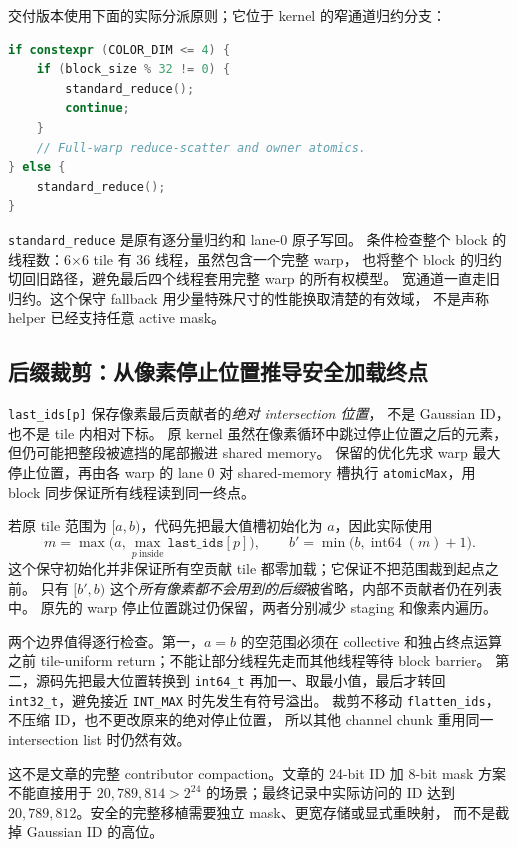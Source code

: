 交付版本使用下面的实际分派原则；它位于 kernel 的窄通道归约分支：
\begin{lstlisting}[language=C++]
if constexpr (COLOR_DIM <= 4) {
    if (block_size % 32 != 0) {
        standard_reduce();
        continue;
    }
    // Full-warp reduce-scatter and owner atomics.
} else {
    standard_reduce();
}
\end{lstlisting}
\texttt{standard\_reduce} 是原有逐分量归约和 lane-0 原子写回。
条件检查整个 block 的线程数：6\(\times\)6 tile 有 36 线程，虽然包含一个完整 warp，
也将整个 block 的归约切回旧路径，避免最后四个线程套用完整 warp 的所有权模型。
宽通道一直走旧归约。这个保守 fallback 用少量特殊尺寸的性能换取清楚的有效域，
不是声称 helper 已经支持任意 active mask。

\subsection{后缀裁剪：从像素停止位置推导安全加载终点}

\texttt{last\_ids[p]} 保存像素最后贡献者的\emph{绝对 intersection 位置}，
不是 Gaussian ID，也不是 tile 内相对下标。
原 kernel 虽然在像素循环中跳过停止位置之后的元素，但仍可能把整段被遮挡的尾部搬进 shared memory。
保留的优化先求 warp 最大停止位置，再由各 warp 的 lane 0 对 shared-memory 槽执行
\texttt{atomicMax}，用 block 同步保证所有线程读到同一终点。

若原 tile 范围为 \([a,b)\)，代码先把最大值槽初始化为 \(a\)，因此实际使用
\[
 m=\max\bigl(a,\max_{p\ \mathrm{inside}}\texttt{last\_ids}[p]\bigr),
 \qquad b'=\min\bigl(b,\operatorname{int64}(m)+1\bigr).
\]
这个保守初始化并非保证所有空贡献 tile 都零加载；它保证不把范围裁到起点之前。
只有 \([b',b)\) 这个\emph{所有像素都不会用到的后缀}被省略，内部不贡献者仍在列表中。
原先的 warp 停止位置跳过仍保留，两者分别减少 staging 和像素内遍历。

两个边界值得逐行检查。第一，\(a=b\) 的空范围必须在 collective 和独占终点运算之前
tile-uniform return；不能让部分线程先走而其他线程等待 block barrier。
第二，源码先把最大位置转换到 \texttt{int64\_t} 再加一、取最小值，最后才转回
\texttt{int32\_t}，避免接近 \texttt{INT\_MAX} 时先发生有符号溢出。
裁剪不移动 \texttt{flatten\_ids}，不压缩 ID，也不更改原来的绝对停止位置，
所以其他 channel chunk 重用同一 intersection list 时仍然有效。

这不是文章的完整 contributor compaction。文章的 24-bit ID 加 8-bit mask 方案不能直接用于
\(20{,}789{,}814>2^{24}\) 的场景；最终记录中实际访问的 ID 达到
\(20{,}789{,}812\)。安全的完整移植需要独立 mask、更宽存储或显式重映射，
而不是截掉 Gaussian ID 的高位。

